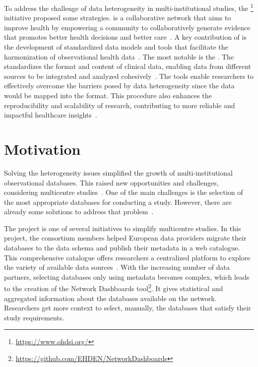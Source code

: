 To address the challenge of data heterogeneity in multi-institutional studies, the \textbf{{\ohdsi}}\footnote{\url{https://www.ohdsi.org/}} initiative proposed some strategies. {\ohdsi} is a collaborative network that aims to improve health by empowering a community to collaboratively generate evidence that promotes better health decisions and better care~\cite{hripcsak2016characterizing}. A key contribution of {\ohdsi} is the development of standardized data models and tools that facilitate the harmonization of observational health data~\cite{park2023exploring}. The most notable is the {\omop}. The {\omop} standardizes the format and content of clinical data, enabling data from different sources to be integrated and analyzed cohesively~\cite{hripcsak2016characterizing,almeida2021two}. The {\ohdsi} tools enable researchers to effectively overcome the barriers posed by data heterogeneity since the data would be mapped into the {\omop} format. This procedure also enhances the reproducibility and scalability of research, contributing to more reliable and impactful healthcare insights~\cite{reich2024ohdsi}.


\section{Motivation}


Solving the heterogeneity issues simplified the growth of multi-institutional observational databases. This raised new opportunities and challenges, considering multicentre studies~\cite{almeida2023clinical}. One of the main challenges is the selection of the most appropriate databases for conducting a study. However, there are already some solutions to address that problem~\cite{almeida2024montra2, silva2018montra, oliveira2019emif}. 

The {\ehden} project is one of several initiatives to simplify multicentre studies. In this project, the consortium members helped European data providers migrate their databases to the {\omop} data schema and publish their metadata in a web catalogue. This comprehensive catalogue offers researchers a centralized platform to explore the variety of available data sources~\cite{almeida2023fair}. With the increasing number of data partners, selecting databases only using metadata becomes complex, which leads to the creation of the {\ehden} Network Dashboards tool\footnote{\url{https://github.com/EHDEN/NetworkDashboards}}. It gives statistical and aggregated information about the databases available on the network. Researchers get more context to select, manually, the databases that satisfy their study requirements.

